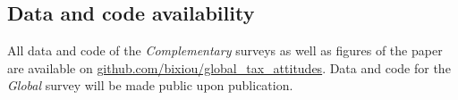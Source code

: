 \begin{small}
\section*{\normalsize Data and code availability}

All data and code of the \textit{Complementary} surveys as well as figures of the paper are available on \href{https://github.com/bixiou/international_attitudes_toward_global_policies}{github.com/bixiou/global\_tax\_attitudes}. Data and code for the \textit{Global} survey will be made public upon publication.

\end{small}  %

\renewcommand{\url}[1]{\href{#1}{Link}} %


\appendix %
\renewcommand{\thetable}{S\arabic{table}}
\renewcommand{\thefigure}{S\arabic{figure}}
\setcounter{figure}{8}
\setcounter{table}{1}


 

